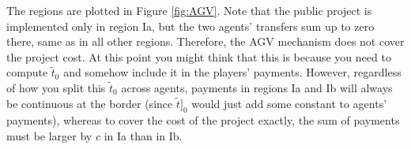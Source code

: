\documentclass[a4paper]{article}
\begin{document}
The regions are plotted in Figure \ref{fig:AGV}. Note that the public project is implemented only in region Ia, but the two agents' transfers sum up to zero there, same as in all other regions. Therefore, the AGV mechanism does not cover the project cost.
At this point you might think that this is because you need to compute $\tilde{t}_0$ and somehow include it in the players' payments. However, regardless of how you split this $\tilde{t}_0$ across agents, payments in regions Ia and Ib will always be continuous at the border (since $\tilde{t}]_0$ would just add some constant to agents' payments), whereas to cover the cost of the project exactly, the sum of payments must be larger by $c$ in Ia than in Ib.
\fi 


\end{document}
